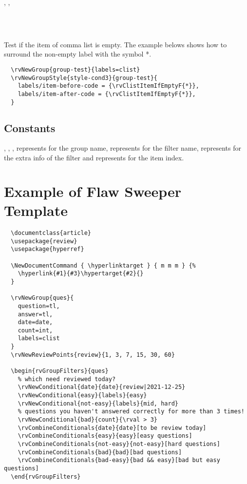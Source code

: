 \documentclass[full]{l3doc}
\begin{document}
\begin{documentation}
\begin{function}{\rvClistItemIfEmptyT, \rvClistItemIfEmptyF, \rvClistItemIfEmptyTF}
  \begin{syntax}
       \\
      \\
     
  \end{syntax}

  Test if the item of comma list is empty. The example belows shows how to
  surround the non-empty label with the symbol *.
\end{function}

\begin{verbatim}
  \rvNewGroup{group-test}{labels=clist}
  \rvNewGroupStyle{style-cond3}{group-test}{
    labels/item-before-code = {\rvClistItemIfEmptyF{*}},
    labels/item-after-code = {\rvClistItemIfEmptyF{*}},
  }
\end{verbatim}

\subsection{Constants}

\begin{function}{\rvGroup, \rvFilterName, \rvFilterInfo, \rvIndex}
   represents for the group name,  represents for
  the filter name,  represents for the extra info of the
  filter and  represents for the item index.
\end{function}

\section{Example of Flaw Sweeper Template}
\label{sec:example}

\begin{verbatim}
  \documentclass{article}
  \usepackage{review}
  \usepackage{hyperref}

  \NewDocumentCommand { \hyperlinktarget } { m m m } {%
    \hyperlink{#1}{#3}\hypertarget{#2}{}
  }

  \rvNewGroup{ques}{
    question=tl,
    answer=tl,
    date=date,
    count=int,
    labels=clist
  }
  \rvNewReviewPoints{review}{1, 3, 7, 15, 30, 60}

  \begin{rvGroupFilters}{ques}
    % which need reviewed today?
    \rvNewConditional{date}{date}{review|2021-12-25}
    \rvNewConditional{easy}{labels}{easy}
    \rvNewConditional{not-easy}{labels}{mid, hard}
    % questions you haven't answered correctly for more than 3 times!
    \rvNewConditional{bad}{count}{\rval > 3}
    \rvCombineConditionals{date}{date}[to be review today]
    \rvCombineConditionals{easy}{easy}[easy questions]
    \rvCombineConditionals{not-easy}{not-easy}[hard questions]
    \rvCombineConditionals{bad}{bad}[bad questions]
    \rvCombineConditionals{bad-easy}{bad && easy}[bad but easy questions]
  \end{rvGroupFilters}


\end{verbatim}
\end{documentation}
\end{document}
